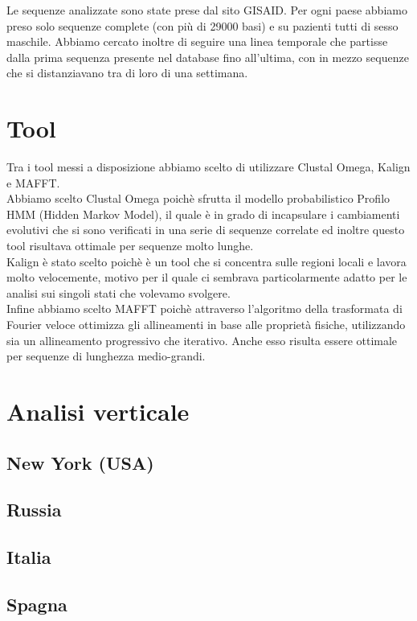 \documentclass[a4paper,10pt]{article}
\begin{document}
Le sequenze analizzate sono state prese dal sito GISAID. Per ogni paese abbiamo preso solo sequenze complete (con più di 29000 basi) e su pazienti tutti di sesso maschile. Abbiamo cercato inoltre di seguire una linea temporale che partisse dalla prima sequenza presente nel database fino all'ultima, con in mezzo sequenze che si distanziavano tra di loro di una settimana.

\section{Tool}
Tra i tool messi a disposizione abbiamo scelto di utilizzare Clustal Omega, Kalign e MAFFT.\\
Abbiamo scelto Clustal Omega poichè sfrutta il modello probabilistico Profilo HMM (Hidden Markov Model), il quale è in grado di incapsulare i cambiamenti evolutivi che si sono verificati in una serie di sequenze correlate ed inoltre questo tool risultava ottimale per sequenze molto lunghe.\\
Kalign è stato scelto poichè è un tool che si concentra sulle regioni locali e lavora molto velocemente, motivo per il quale ci sembrava particolarmente adatto per le analisi sui singoli stati che volevamo svolgere.\\
Infine abbiamo scelto MAFFT poichè attraverso l'algoritmo della trasformata di Fourier veloce ottimizza gli allineamenti in base alle proprietà fisiche, utilizzando sia un allineamento progressivo che iterativo. Anche esso risulta essere ottimale per sequenze di lunghezza medio-grandi.

\section{Analisi verticale}

\subsection{New York (USA)}

\subsection{Russia}

\subsection{Italia}


\subsection{Spagna}
\end{document}
